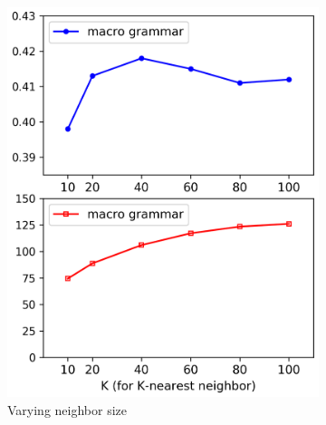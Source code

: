 \begin{figure}[t]
\begin{subfigure}[b]{0.333\textwidth}
\includegraphics[width=1.0\linewidth]{figures/wtq/nn_k_split_high.png}
\caption{Varying neighbor size}
\label{fig:macro-hyperparam-b}
\end{subfigure}%
\begin{subfigure}[b]{0.333\textwidth}\centering

\end{subfigure}
\end{figure}
